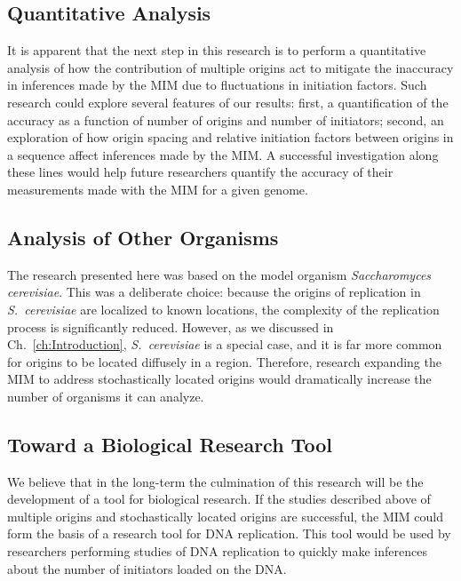 		\subsection{Quantitative Analysis}
		
		It is apparent that the next step in this research is to perform a quantitative analysis of how the contribution of multiple origins act to mitigate the inaccuracy in inferences made by the MIM due to fluctuations in initiation factors.
		Such research could explore several features of our results:
		first, a quantification of the accuracy as a function of number of origins and number of initiators;
		second, an exploration of how origin spacing and relative initiation factors between origins in a sequence affect inferences made by the MIM.
		A successful investigation along these lines would help future researchers quantify the accuracy of their measurements made with the MIM for a given genome.
		
		
		\subsection{Analysis of Other Organisms}
		
		The research presented here was based on the model organism \emph{Saccharomyces cerevisiae}.
		This was a deliberate choice: because the origins of replication in \emph{S.~cerevisiae} are localized to known locations, the complexity of the replication process is significantly reduced.
		However, as we discussed in Ch.~\ref{ch:Introduction}, \emph{S.~cerevisiae} is a special case, and it is far more common for origins to be located diffusely in a region.
		Therefore, research expanding the MIM to address stochastically located origins would dramatically increase the number of organisms it can analyze.
		
		
		\subsection{Toward a Biological Research Tool}
		
		We believe that in the long-term  the culmination of this research will be the development of a tool for biological research.
		If the studies described above of multiple origins and stochastically located origins are successful, the MIM could form the basis of a research tool for DNA replication.
		This tool would be used by researchers performing studies of DNA replication to quickly make inferences about the number of initiators loaded on the DNA.
		
